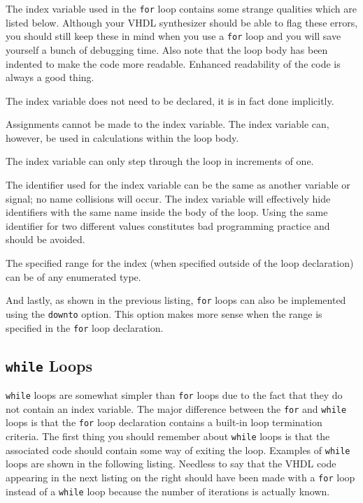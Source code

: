 The index variable used in the \texttt{for} loop contains some strange qualities which are listed below. Although your VHDL synthesizer should be able to flag these errors, you should still keep these in mind when you use a \texttt{for} loop and you will save yourself a bunch of debugging time. Also note that the loop body has been indented to make the code more readable. Enhanced readability of the code is always a good thing. 
\begin{my_list}
\item The index variable does not need to be declared, it is in fact done implicitly. 

\item Assignments cannot be made to the index variable. The index variable can, however, be used in calculations within the loop body. 

\item The index variable can only step through the loop in increments of one. 

\item The identifier used for the index variable can be the same as another variable or signal; no name collisions will occur. The index variable will effectively hide identifiers with the same name inside the body of the loop. Using the same identifier for two different values constitutes bad programming practice and should be avoided. 

\item The specified range for the index (when specified outside of the loop declaration) can be of any enumerated type.
\end{my_list}

And lastly, as shown in the previous listing, \texttt{for} loops can also be implemented using the \texttt{downto} option. This option makes more sense when the range is specified in the \texttt{for} loop declaration. 

\subsection{\texttt{while} Loops}
\texttt{while} loops are somewhat simpler than \texttt{for} loops due to the fact that they do not contain an index variable. The major difference between the \texttt{for} and \texttt{while} loops is that the \texttt{for} loop declaration contains a built-in loop termination criteria. The first thing you should remember about \texttt{while} loops is that the associated code should contain some way of exiting the loop. Examples of \texttt{while} loops are shown in the following listing. Needless to say that the VHDL code appearing in the next listing on the right should have been made with a \texttt{for} loop instead of a \texttt{while} loop because the number of iterations is actually known. 

